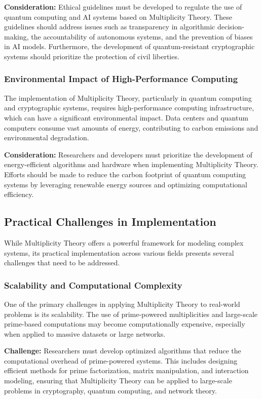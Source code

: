\documentclass[%
 preprint, linenumbers,
 amsmath,amssymb,
 aps, physrev,
]{revtex4-2}
\begin{document}
\textbf{Consideration:} Ethical guidelines must be developed to regulate the use of quantum computing and AI systems based on Multiplicity Theory. These guidelines should address issues such as transparency in algorithmic decision-making, the accountability of autonomous systems, and the prevention of biases in AI models. Furthermore, the development of quantum-resistant cryptographic systems should prioritize the protection of civil liberties.

\subsubsection{Environmental Impact of High-Performance Computing}
The implementation of Multiplicity Theory, particularly in quantum computing and cryptographic systems, requires high-performance computing infrastructure, which can have a significant environmental impact. Data centers and quantum computers consume vast amounts of energy, contributing to carbon emissions and environmental degradation.

\textbf{Consideration:} Researchers and developers must prioritize the development of energy-efficient algorithms and hardware when implementing Multiplicity Theory. Efforts should be made to reduce the carbon footprint of quantum computing systems by leveraging renewable energy sources and optimizing computational efficiency.

\subsection{Practical Challenges in Implementation}
While Multiplicity Theory offers a powerful framework for modeling complex systems, its practical implementation across various fields presents several challenges that need to be addressed.

\subsubsection{Scalability and Computational Complexity}
One of the primary challenges in applying Multiplicity Theory to real-world problems is its scalability. The use of prime-powered multiplicities and large-scale prime-based computations may become computationally expensive, especially when applied to massive datasets or large networks.

\textbf{Challenge:} Researchers must develop optimized algorithms that reduce the computational overhead of prime-powered systems. This includes designing efficient methods for prime factorization, matrix manipulation, and interaction modeling, ensuring that Multiplicity Theory can be applied to large-scale problems in cryptography, quantum computing, and network theory.
\end{document}
